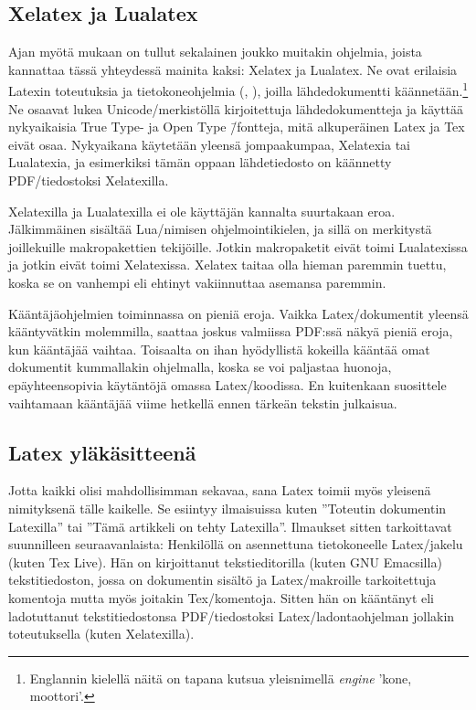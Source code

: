 \subsection{Xelatex ja Lualatex}

Ajan myötä mukaan on tullut sekalainen joukko muitakin ohjelmia, joista
kannattaa tässä yhteydessä mainita kaksi: Xelatex ja Lualatex. Ne ovat
erilaisia Latexin toteutuksia ja tietokone\-ohjelmia (,
), joilla lähdedokumentti käännetään.\footnote{Englannin
  kielellä näitä on tapana kutsua yleisnimellä
  \emph{\textenglish{engine}} 'kone, moottori'.} Ne osaavat lukea
Unicode\-/merkistöllä kirjoitettuja lähdedokumentteja ja käyttää
nyky\-aikaisia True Type- ja Open Type \=/fontteja, mitä alkuperäinen
Latex ja Tex eivät osaa. Nyky\-aikana käytetään yleensä jompaakumpaa,
Xelatexia tai Lualatexia, ja esimerkiksi tämän oppaan lähdetiedosto on
käännetty PDF\-/tiedostoksi Xelatexilla.

Xelatexilla ja Lualatexilla ei ole käyttäjän kannalta suurtakaan eroa.
Jälkimmäinen sisältää Lua\-/nimisen ohjelmointikielen, ja sillä on
merkitystä joillekuille makropakettien tekijöille. Jotkin makropaketit
eivät toimi Lualatexissa ja jotkin eivät toimi Xelatexissa. Xelatex
taitaa olla hieman paremmin tuettu, koska se on vanhempi eli ehtinyt
vakiinnuttaa asemansa paremmin.

Kääntäjäohjelmien toiminnassa on pieniä eroja. Vaikka Latex\-/dokumentit
yleensä kääntyvätkin molemmilla, saattaa joskus valmiissa PDF:ssä näkyä
pieniä eroja, kun kääntäjää vaihtaa. Toisaalta on ihan hyödyllistä
kokeilla kääntää omat dokumentit kummallakin ohjelmalla, koska se voi
paljastaa huonoja, epäyhteensopivia käytäntöjä omassa Latex\-/koodissa.
En kuitenkaan suosittele vaihtamaan kääntäjää viime hetkellä ennen
tärkeän tekstin julkaisua.

\subsection{Latex yläkäsitteenä}

Jotta kaikki olisi mahdollisimman sekavaa, sana Latex toimii myös
yleisenä nimityksenä tälle kaikelle. Se esiintyy ilmaisuissa kuten
''Toteutin dokumentin Latexilla'' tai ''Tämä artikkeli on tehty
Latexilla''. Ilmaukset sitten tarkoittavat suunnilleen seuraavanlaista:
Henkilöllä on asennettuna tietokoneelle Latex\-/jakelu (kuten Tex Live).
Hän on kirjoittanut tekstieditorilla (kuten GNU Emacsilla)
tekstitiedoston, jossa on dokumentin sisältö ja Latex\-/makroille
tarkoitettuja komentoja mutta myös joitakin Tex\-/komentoja. Sitten hän
on kääntänyt eli ladotuttanut tekstitiedostonsa PDF\-/tiedostoksi
Latex\-/ladontaohjelman jollakin toteutuksella (kuten Xelatexilla).

